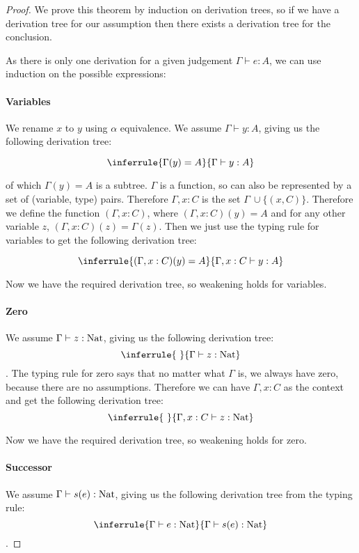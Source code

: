 \begin{proof}
We prove this theorem by induction on derivation trees, so if we have a derivation tree for our assumption then there exists a derivation tree for the conclusion.%



As there is only one derivation for a given judgement $\Gamma \vdash e : A$, we can use induction on the possible expressions:

\paragraph{Variables} We rename $x$ to $y$ using $\alpha$ equivalence. We assume $\Gamma \vdash y : A$, giving us the following derivation tree:

$$
\inferrule{\Gamma(y) = A}{\Gamma \vdash y : A}
$$ 

of which $\Gamma(y) = A$ is a subtree. $\Gamma$ is a function, so can also be represented by a set of (variable, type) pairs. Therefore $\Gamma, x: C$ is the set $\Gamma \ \cup \{(x,C)\}$. Therefore we define the function $(\Gamma,x:C)$, where $(\Gamma,x:C)(y) = A$ and for any other variable $z$, $(\Gamma, x:C)(z) = \Gamma(z)$. Then we just use the typing rule for variables to get the following derivation tree:

$$
\inferrule{(\Gamma, x : C) (y) = A}{\Gamma, x : C \vdash y : A}
$$ 

Now we have the required derivation tree, so weakening holds for variables.

\paragraph{Zero} We assume $\Gamma \vdash z : \operatorname{Nat}$, giving us the following derivation tree:
$$
\inferrule{ \ }{\Gamma \vdash z : \nat}
$$.
The typing rule for zero says that no matter what $\Gamma$ is, we always have zero, because there are no assumptions. Therefore we can have $\Gamma, x: C$ as the context and get the following derivation tree:
$$
\inferrule{ \ }{\Gamma,x :C \vdash z : \nat}
$$

Now we have the required derivation tree, so weakening holds for zero.

\paragraph{Successor} We assume $\Gamma \vdash s(e) : \operatorname{Nat}$, giving us the following derivation tree from the typing rule:
$$
\inferrule{\Gamma \vdash e : \nat}{\Gamma \vdash s(e) : \nat}
$$.


\end{proof}
